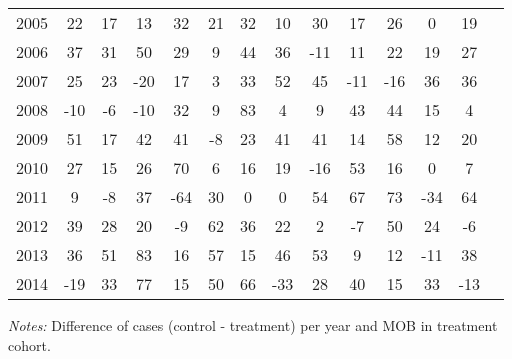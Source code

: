 \begin{table}[H]
\begin{threeparttable}
{\begin{tabular}{l*{13}{c}}
2005        &          22&          17&          13&          32&          21&          32&          10&          30&          17&          26&           0&          19\\
2006        &          37&          31&          50&          29&           9&          44&          36&         -11&          11&          22&          19&          27\\
2007        &          25&          23&         -20&          17&           3&          33&          52&          45&         -11&         -16&          36&          36\\
2008        &         -10&          -6&         -10&          32&           9&          83&           4&           9&          43&          44&          15&           4\\
2009        &          51&          17&          42&          41&          -8&          23&          41&          41&          14&          58&          12&          20\\
2010        &          27&          15&          26&          70&           6&          16&          19&         -16&          53&          16&           0&           7\\
2011        &           9&          -8&          37&         -64&          30&           0&           0&          54&          67&          73&         -34&          64\\
2012        &          39&          28&          20&          -9&          62&          36&          22&           2&          -7&          50&          24&          -6\\
2013        &          36&          51&          83&          16&          57&          15&          46&          53&           9&          12&         -11&          38\\
2014        &         -19&          33&          77&          15&          50&          66&         -33&          28&          40&          15&          33&         -13\\
 \bottomrule \end{tabular} } \begin{tablenotes} \item \scriptsize \emph{Notes:} Difference of cases (control - treatment) per year and MOB in treatment cohort. \end{tablenotes} \end{threeparttable} \end{table} 
